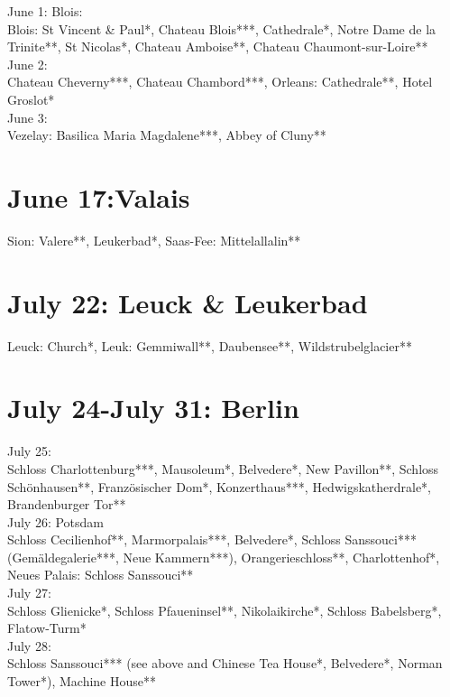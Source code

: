 June 1: Blois:\\
Blois: St Vincent \& Paul*, Chateau Blois***, Cathedrale*, Notre Dame de la Trinite**, St Nicolas*, Chateau Amboise**, Chateau Chaumont-sur-Loire**\\

June 2:\\
Chateau Cheverny***, Chateau Chambord***, Orleans: Cathedrale**, Hotel Groslot*\\

June 3:\\
Vezelay: Basilica Maria Magdalene***, Abbey of Cluny**

\section{June 17:Valais}
\label{Valais2012}

Sion: Valere**, Leukerbad*, Saas-Fee: Mittelallalin**

\section{July 22: Leuck \& Leukerbad}
\label{Leuk2012}

Leuck: Church*, Leuk: Gemmiwall**, Daubensee**, Wildstrubelglacier**

\section{July 24-July 31: Berlin}
\label{Berlin2012}

July 25:\\
Schloss Charlottenburg***, Mausoleum*, Belvedere*, New Pavillon**, Schloss Sch\"onhausen**, Franz\"osischer Dom*, Konzerthaus***, Hedwigskatherdrale*, Brandenburger Tor**\\

July 26: Potsdam\\
Schloss Cecilienhof**, Marmorpalais***, Belvedere*, Schloss Sanssouci*** (Gem\"aldegalerie***, Neue Kammern***), Orangerieschloss**, Charlottenhof*, Neues Palais: Schloss Sanssouci**\\

July 27:\\
Schloss Glienicke*, Schloss Pfaueninsel**, Nikolaikirche*, Schloss Babelsberg*, Flatow-Turm*\\

July 28:\\
Schloss Sanssouci*** (see above and Chinese Tea House*, Belvedere*, Norman Tower*), Machine House**\\

